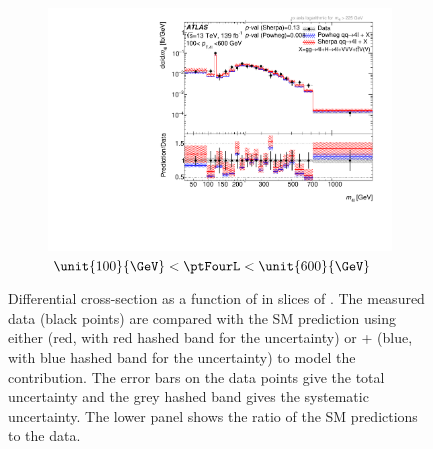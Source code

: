 \begin{figure}[htb!]
\begin{subfigure}{.49\textwidth}
      \includegraphics[width=.99\linewidth]{Figures/m4l/UnfoldedResults/linlog_Unfolded_Data_m4l_pt4l100-600.pdf}  \caption{$\unit{100}{\GeV} <  \ptFourL  < \unit{60 0}{\GeV}$}\label{fig:sub-fifth}
    \end{subfigure}
    \caption{Differential cross-section as a function of \mFourL{} in slices of \ptFourL{}. The measured data (black points) are  compared with the SM prediction using either \SHERPA{} (red, with red hashed band for the uncertainty) or \POWHEG{} + \pythia{} (blue, with blue hashed band for the uncertainty) to model the \qqFourL{} contribution. The error bars on the data points give the total uncertainty and the grey hashed band gives the systematic uncertainty. \Pvalue{} The  lower panel shows the ratio of the SM predictions to the data.}
    \label{fig:m4l_pt4l}
\end{figure}

